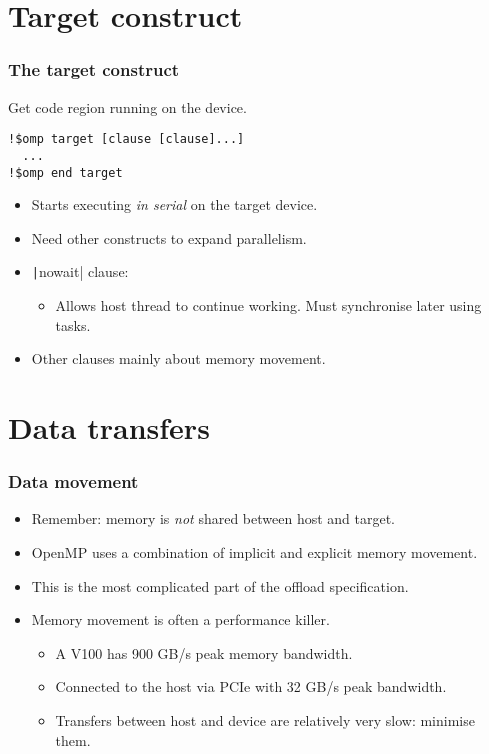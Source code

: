\documentclass[aspectratio=169]{beamer}
\begin{document}
\section{Target construct}
\begin{frame}[fragile]
\frametitle{The target construct}

Get code region running on the device.

\begin{verbatim}
!$omp target [clause [clause]...]
  ...
!$omp end target 
\end{verbatim}
\begin{itemize}
  \item Starts executing \emph{in serial} on the target device.
  \item Need other constructs to expand parallelism.
  \item \texttt|nowait| clause:
    \begin{itemize}
      \item Allows host thread to continue working. Must synchronise later using tasks.
    \end{itemize}
  \item Other clauses mainly about memory movement.
\end{itemize}
\end{frame}

\section{Data transfers}
\begin{frame}
\frametitle{Data movement}
\begin{itemize}
  \item Remember: memory is \emph{not} shared between host and target.
  \item OpenMP uses a combination of implicit and explicit memory movement.
  \item This is the most complicated part of the offload specification.

\vfill

  \item Memory movement is often a performance killer.
    \begin{itemize}
      \item A V100 has 900 GB/s peak memory bandwidth.
      \item Connected to the host via PCIe with 32 GB/s peak bandwidth.
      \item Transfers between host and device are relatively very slow: minimise them.
    \end{itemize}
\end{itemize}
\end{frame}
\end{document}

